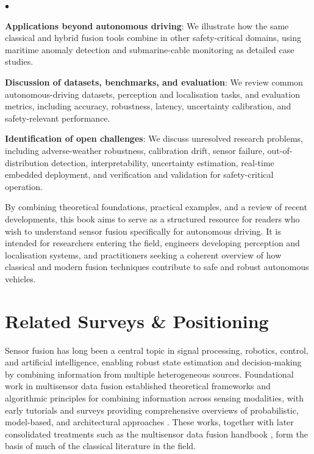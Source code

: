 \documentclass[11pt,oneside,openany]{book}
\newenvironment{list4a}{
  \begin{list}{$\bullet$}{%
      \setlength{\itemsep}{0.05cm}
      \setlength{\labelsep}{0.2cm}
      \setlength{\labelwidth}{0.3cm}
      \setlength{\parsep}{0in}
      \setlength{\parskip}{0in}
      \setlength{\topsep}{0in}
      \setlength{\partopsep}{0in}
      \setlength{\leftmargin}{0.16in}}}
      {\end{list}}
\begin{document}
\begin{list4a}
    \item \textbf{Applications beyond autonomous driving}: We illustrate how the same classical and hybrid fusion tools combine in other safety-critical domains, using maritime anomaly detection and submarine-cable monitoring as detailed case studies.
    \item \textbf{Discussion of datasets, benchmarks, and evaluation}: We review common autonomous-driving datasets, perception and localisation tasks, and evaluation metrics, including accuracy, robustness, latency, uncertainty calibration, and safety-relevant performance.
    \item \textbf{Identification of open challenges}: We discuss unresolved research problems, including adverse-weather robustness, calibration drift, sensor failure, out-of-distribution detection, interpretability, uncertainty estimation, real-time embedded deployment, and verification and validation for safety-critical operation.
\end{list4a}

By combining theoretical foundations, practical examples, and a review of recent developments, this book aims to serve as a structured resource for readers who wish to understand sensor fusion specifically for autonomous driving. It is intended for researchers entering the field, engineers developing perception and localisation systems, and practitioners seeking a coherent overview of how classical and modern fusion techniques contribute to safe and robust autonomous vehicles. 

\section{Related Surveys \& Positioning}
\label{subsec:related}

Sensor fusion has long been a central topic in signal processing, robotics, control, and artificial intelligence, enabling robust state estimation and decision-making by combining information from multiple heterogeneous sources. Foundational work in multisensor data fusion established theoretical frameworks and algorithmic principles for combining information across sensing modalities, with early tutorials and surveys providing comprehensive overviews of probabilistic, model-based, and architectural approaches \cite{hall_introduction_1997, luo_multisensor_1989}. These works, together with later consolidated treatments such as the multisensor data fusion handbook \cite{liggins_handbook_2009}, form the basis of much of the classical literature in the field.
\end{document}

